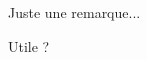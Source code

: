 
\begin{bdocrem}
    Juste une remarque...
\end{bdocrem}

\begin{bdocrem}
    Utile ?
\end{bdocrem}
